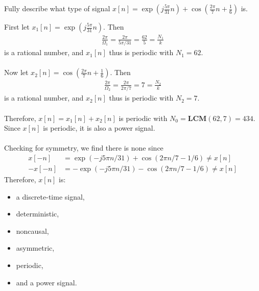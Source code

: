 \documentclass{report}
\begin{document}
\begin{example}
    Fully describe what type of signal $x[n] = \exp(j\frac{5\pi}{31}n) + \cos(\frac{2\pi}{7}n+\frac{1}{6})$ is.
\end{example}
\begin{solution}
    First let $x_1[n] = \exp(j\frac{5\pi}{31}n)$. Then
    \begin{align*}
        \frac{2\pi}{\Omega_1} = \frac{2\pi}{5\pi/31} = \frac{62}{5} = \frac{N_1}{k}
    \end{align*}
    is a rational number, and $x_1[n]$ thus is periodic with $N_1 = 62$.
    \\ \\
    Now let $x_2[n] = \cos(\frac{2\pi}{7}n+\frac{1}{6})$. Then
    \begin{align*}
        \frac{2\pi}{\Omega_2} = \frac{2\pi}{2\pi/7} = 7 = \frac{N_2}{k}
    \end{align*}
    is a rational number, and $x_2[n]$ thus is periodic with $N_2 = 7$. 
    \\ \\
    Therefore, $x[n] = x_1[n] + x_2[n]$ is periodic with $N_0 = \mathbf{LCM}(62,7) = 434$. Since $x[n]$ is periodic, it is also a power signal. 
    \\ \\
    Checking for symmetry, we find there is none since
    \begin{align*}
        x[-n] &= \exp(-j5\pi n/31) + \cos(2\pi n/7 - 1/6) \neq x[n] \\
        -x[-n] &= -\exp(-j5\pi n/31) - \cos(2\pi n/7 - 1/6) \neq x[n]
    \end{align*}
    Therefore, $x[n]$ is:
    \begin{itemize}
        \item a discrete-time signal,
        \item deterministic, 
        \item noncausal, 
        \item asymmetric,
        \item periodic,
        \item and a power signal.
    \end{itemize}
\end{solution}
\end{document}
